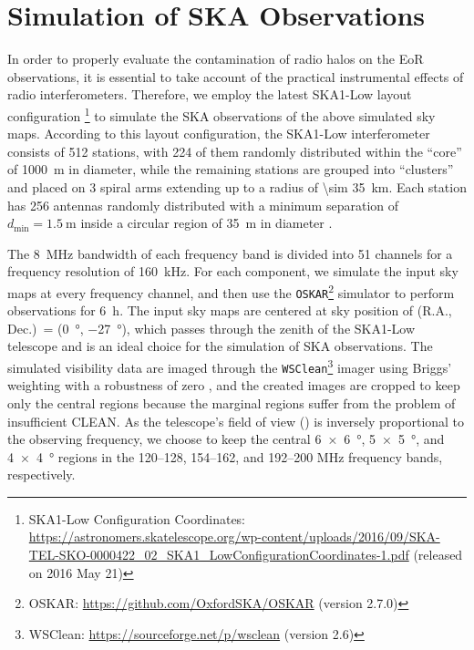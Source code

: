 \documentclass[twocolumn]{aastex62}
\newcommand{\R}[1]{\mathrm{#1}}
\newcommand{\fov}{\text{Fo\!V}}
\begin{document}
\section{Simulation of SKA Observations}
\label{sec:obs-simu}

In order to properly evaluate the contamination of radio halos
on the EoR observations, it is essential to take account of the
practical instrumental effects of radio interferometers.
Therefore, we employ the latest SKA1-Low layout configuration%
\footnote{\raggedright%
  SKA1-Low Configuration Coordinates:
  \url{https://astronomers.skatelescope.org/wp-content/uploads/2016/09/SKA-TEL-SKO-0000422_02_SKA1_LowConfigurationCoordinates-1.pdf}
  (released on 2016 May 21)
}
to simulate the SKA observations of the above simulated sky maps.
According to this layout configuration,
the SKA1-Low interferometer consists of 512 stations, with 224 of them
randomly distributed within the \enquote{core} of \SI{1000}{\meter} in
diameter, while the remaining stations are grouped into \enquote{clusters}
and placed on 3 spiral arms extending up to a radius of
\SI{\sim 35}{\kilo\meter}.
Each station has 256 antennas randomly distributed with a minimum separation
of $d_{\R{min}} = \SI{1.5}{\meter}$ inside a circular region of
\SI{35}{\meter} in diameter \citep[e.g.,][]{mort2017}.

The \SI{8}{\MHz} bandwidth of each frequency band is divided into 51
channels for a frequency resolution of \SI{160}{\kilo\hertz}.
For each component, we simulate the input sky maps at every frequency
channel, and then use the \texttt{OSKAR}\footnote{%
  OSKAR: \url{https://github.com/OxfordSKA/OSKAR} (version 2.7.0)}
simulator \citep{mort2010} to perform observations for \SI{6}{\hour}.
The input sky maps are centered at sky position of
(R.A., Dec.)\ = (\SI{0}{\degree}, \SI{-27}{\degree}),
which passes through the zenith of the SKA1-Low telescope and
is an ideal choice for the simulation of SKA observations.
The simulated visibility data are imaged through the
\texttt{WSClean}\footnote{%
  WSClean: \url{https://sourceforge.net/p/wsclean} (version 2.6)}
imager \citep{offringa2014} using Briggs' weighting with a
robustness of zero \citep{briggs1995},
and the created images are cropped to keep only the central regions
because the marginal regions suffer from the problem of insufficient
CLEAN.
As the telescope's field of view (\fov) is inversely proportional to
the observing frequency, we choose to keep the central
\SI[product-units=repeat]{6 x 6}{\degree},
\SI[product-units=repeat]{5 x 5}{\degree}, and
\SI[product-units=repeat]{4 x 4}{\degree}
regions in the \numrange{120}{128}, \numrange{154}{162}, and
\numrange{192}{200} \si{\MHz} frequency bands, respectively.
\end{document}
